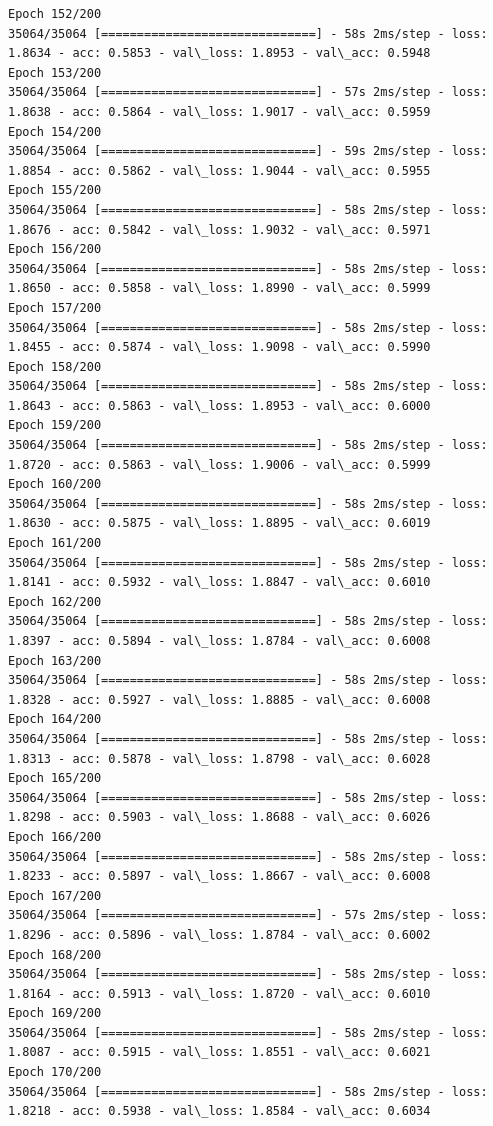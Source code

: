 \documentclass[11pt]{article}
\begin{document}
\begin{Verbatim}[commandchars=\\\{\}]
Epoch 152/200
35064/35064 [==============================] - 58s 2ms/step - loss: 1.8634 - acc: 0.5853 - val\_loss: 1.8953 - val\_acc: 0.5948
Epoch 153/200
35064/35064 [==============================] - 57s 2ms/step - loss: 1.8638 - acc: 0.5864 - val\_loss: 1.9017 - val\_acc: 0.5959
Epoch 154/200
35064/35064 [==============================] - 59s 2ms/step - loss: 1.8854 - acc: 0.5862 - val\_loss: 1.9044 - val\_acc: 0.5955
Epoch 155/200
35064/35064 [==============================] - 58s 2ms/step - loss: 1.8676 - acc: 0.5842 - val\_loss: 1.9032 - val\_acc: 0.5971
Epoch 156/200
35064/35064 [==============================] - 58s 2ms/step - loss: 1.8650 - acc: 0.5858 - val\_loss: 1.8990 - val\_acc: 0.5999
Epoch 157/200
35064/35064 [==============================] - 58s 2ms/step - loss: 1.8455 - acc: 0.5874 - val\_loss: 1.9098 - val\_acc: 0.5990
Epoch 158/200
35064/35064 [==============================] - 58s 2ms/step - loss: 1.8643 - acc: 0.5863 - val\_loss: 1.8953 - val\_acc: 0.6000
Epoch 159/200
35064/35064 [==============================] - 58s 2ms/step - loss: 1.8720 - acc: 0.5863 - val\_loss: 1.9006 - val\_acc: 0.5999
Epoch 160/200
35064/35064 [==============================] - 58s 2ms/step - loss: 1.8630 - acc: 0.5875 - val\_loss: 1.8895 - val\_acc: 0.6019
Epoch 161/200
35064/35064 [==============================] - 58s 2ms/step - loss: 1.8141 - acc: 0.5932 - val\_loss: 1.8847 - val\_acc: 0.6010
Epoch 162/200
35064/35064 [==============================] - 58s 2ms/step - loss: 1.8397 - acc: 0.5894 - val\_loss: 1.8784 - val\_acc: 0.6008
Epoch 163/200
35064/35064 [==============================] - 58s 2ms/step - loss: 1.8328 - acc: 0.5927 - val\_loss: 1.8885 - val\_acc: 0.6008
Epoch 164/200
35064/35064 [==============================] - 58s 2ms/step - loss: 1.8313 - acc: 0.5878 - val\_loss: 1.8798 - val\_acc: 0.6028
Epoch 165/200
35064/35064 [==============================] - 58s 2ms/step - loss: 1.8298 - acc: 0.5903 - val\_loss: 1.8688 - val\_acc: 0.6026
Epoch 166/200
35064/35064 [==============================] - 58s 2ms/step - loss: 1.8233 - acc: 0.5897 - val\_loss: 1.8667 - val\_acc: 0.6008
Epoch 167/200
35064/35064 [==============================] - 57s 2ms/step - loss: 1.8296 - acc: 0.5896 - val\_loss: 1.8784 - val\_acc: 0.6002
Epoch 168/200
35064/35064 [==============================] - 58s 2ms/step - loss: 1.8164 - acc: 0.5913 - val\_loss: 1.8720 - val\_acc: 0.6010
Epoch 169/200
35064/35064 [==============================] - 58s 2ms/step - loss: 1.8087 - acc: 0.5915 - val\_loss: 1.8551 - val\_acc: 0.6021
Epoch 170/200
35064/35064 [==============================] - 58s 2ms/step - loss: 1.8218 - acc: 0.5938 - val\_loss: 1.8584 - val\_acc: 0.6034

\end{Verbatim}
\end{document}

